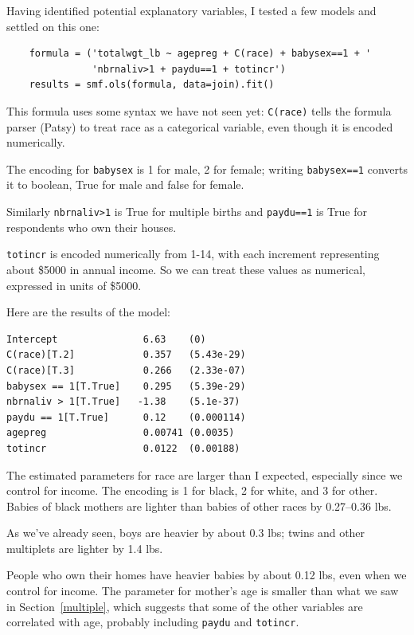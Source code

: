 \documentclass[12pt]{book}
\theoremstyle{exercise}
\begin{document}
Having identified potential explanatory variables, I tested a few
models and settled on this one:%
%

\begin{verbatim}
    formula = ('totalwgt_lb ~ agepreg + C(race) + babysex==1 + '
               'nbrnaliv>1 + paydu==1 + totincr')
    results = smf.ols(formula, data=join).fit()
\end{verbatim}

This formula uses some syntax we have not seen yet:
{\tt C(race)} tells the formula parser (Patsy) to treat race as a
categorical variable, even though it is encoded numerically.%
%

The encoding for {\tt babysex} is 1 for male, 2 for female; writing
{\tt babysex==1} converts it to boolean, True for male and false for
female.%

Similarly {\tt nbrnaliv>1} is True for multiple births and 
{\tt paydu==1} is True for respondents who own their houses.

{\tt totincr} is encoded numerically from 1-14, with each increment
representing about \$5000 in annual income.  So we can treat these
values as numerical, expressed in units of \$5000.%

Here are the results of the model:

\begin{verbatim}
Intercept               6.63    (0)
C(race)[T.2]            0.357   (5.43e-29)
C(race)[T.3]            0.266   (2.33e-07)
babysex == 1[T.True]    0.295   (5.39e-29)
nbrnaliv > 1[T.True]   -1.38    (5.1e-37)
paydu == 1[T.True]      0.12    (0.000114)
agepreg                 0.00741 (0.0035)
totincr                 0.0122  (0.00188)
\end{verbatim}

The estimated parameters for race are larger than I expected,
especially since we control for income.  The encoding
is 1 for black, 2 for white, and 3 for other.  Babies of black
mothers are lighter than babies of other races by 0.27--0.36 lbs.%
%

As we've already seen, boys are heavier by about 0.3 lbs;
twins and other multiplets are lighter by 1.4 lbs.%

People who own their homes have heavier babies by about 0.12 lbs,
even when we control for income.  The parameter for mother's
age is smaller than what we saw in Section~\ref{multiple}, which
suggests that some of the other variables are correlated with
age, probably including {\tt paydu} and {\tt totincr}.%
\end{document}

